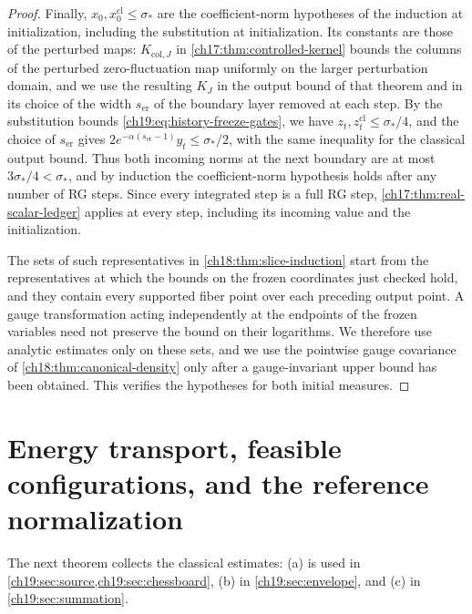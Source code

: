 \begin{proof}
Finally, $x_0,x_0^{\mathrm{cl}}\le\sigma_*$ are the coefficient-norm hypotheses of the induction at initialization, including the substitution at initialization. Its constants are those of the perturbed maps: $K_{\mathrm{col},J}$ in \cref{ch17:thm:controlled-kernel} bounds the columns of the perturbed zero-fluctuation map uniformly on the larger perturbation domain, and we use the resulting $K_J$ in the output bound of that theorem and in its choice of the width $s_{\mathrm{er}}$ of the boundary layer removed at each step. By the substitution bounds \eqref{ch19:eq:history-freeze-gates}, we have $z_t,z_t^{\mathrm{cl}}\le\sigma_*/4$, and the choice of $s_{\mathrm{er}}$ gives $2e^{-\alpha(s_{\mathrm{er}}-1)}y_t\le\sigma_*/2$, with the same inequality for the classical output bound. Thus both incoming norms at the next boundary are at most $3\sigma_*/4<\sigma_*$, and by induction the coefficient-norm hypothesis holds after any number of RG steps. Since every integrated step is a full RG step, \cref{ch17:thm:real-scalar-ledger} applies at every step, including its incoming value and the initialization.

The sets of such representatives in \cref{ch18:thm:slice-induction} start from the representatives at which the bounds on the frozen coordinates just checked hold, and they contain every supported fiber point over each preceding output point. A gauge transformation acting independently at the endpoints of the frozen variables need not preserve the bound on their logarithms. We therefore use analytic estimates only on these sets, and we use the pointwise gauge covariance of \cref{ch18:thm:canonical-density} only after a gauge-invariant upper bound has been obtained. This verifies the hypotheses for both initial measures.
\end{proof}

\section{Energy transport, feasible configurations, and the reference normalization}\label{ch19:sec:energy}

The next theorem collects the classical estimates: (a) is used in \cref{ch19:sec:source,ch19:sec:chessboard}, (b) in \cref{ch19:sec:envelope}, and (c) in \cref{ch19:sec:summation}.

